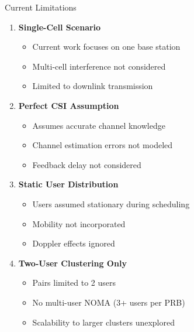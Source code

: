 \documentclass[aspectratio=169]{beamer}
\begin{document}
\begin{frame}{Current Limitations}
    \begin{enumerate}
        \item \textbf{Single-Cell Scenario}
        \begin{itemize}
            \item Current work focuses on one base station
            \item Multi-cell interference not considered
            \item Limited to downlink transmission
        \end{itemize}
        
        \vspace{0.2cm}
        
        \item \textbf{Perfect CSI Assumption}
        \begin{itemize}
            \item Assumes accurate channel knowledge
            \item Channel estimation errors not modeled
            \item Feedback delay not considered
        \end{itemize}
        
        \vspace{0.2cm}
        
        \item \textbf{Static User Distribution}
        \begin{itemize}
            \item Users assumed stationary during scheduling
            \item Mobility not incorporated
            \item Doppler effects ignored
        \end{itemize}
        
        \vspace{0.2cm}
        
        \item \textbf{Two-User Clustering Only}
        \begin{itemize}
            \item Pairs limited to 2 users
            \item No multi-user NOMA (3+ users per PRB)
            \item Scalability to larger clusters unexplored
        \end{itemize}
    \end{enumerate}
\end{frame}
\end{document}
